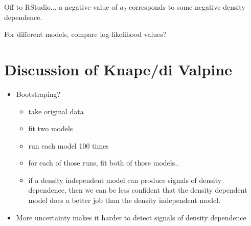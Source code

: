 \documentclass{article}
\begin{document}
                Off to RStudio... a negative value of $a_2$ corresponds to some negative density dependence.

                For different models, compare log-likelihood values?

    \section{Discussion of Knape/di Valpine}

        \begin{itemize}
            \item Bootstraping?
            \begin{itemize}
                \item take original data
                \item fit two models
                \item run each model 100 times
                \item for each of those runs, fit both of those models..
                \item if a density independent model can produce signals of density dependence, then we can be less confident that the density dependent model does a better job than the density independent model.
            \end{itemize}
            \item More uncertainty makes it harder to detect signals of density dependence
        \end{itemize}
\end{document}
